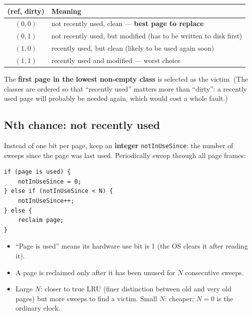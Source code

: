 \documentclass[11pt,a4paper]{article}
\begin{document}
\begin{center}
\renewcommand{\arraystretch}{1.18}
\begin{tabular}{@{}cl@{}}
  \toprule
  \textbf{(ref, dirty)} & \textbf{Meaning} \\
  \midrule
  \((0,0)\) & not recently used, clean --- \textbf{best page to replace} \\
  \((0,1)\) & not recently used, but modified (has to be written to disk first) \\
  \((1,0)\) & recently used, but clean (likely to be used again soon) \\
  \((1,1)\) & recently used and modified --- worst choice \\
  \bottomrule
\end{tabular}
\end{center}

The \textbf{first page in the lowest non-empty class} is selected as the
victim. (The classes are ordered so that ``recently used'' matters more
than ``dirty'': a recently used page will probably be needed again, which
would cost a whole fault.)

\subsection{Nth chance: not recently used}

Instead of one bit per page, keep an \textbf{integer}
\texttt{notInUseSince}: the number of sweeps since the page was last used.
Periodically sweep through all page frames:
\begin{verbatim}
if (page is used) {
    notInUseSince = 0;
} else if (notInUseSince < N) {
    notInUseSince++;
} else {
    reclaim page;
}
\end{verbatim}

\begin{itemize}
  \item ``Page is used'' means its hardware use bit is 1 (the OS clears it
        after reading it).
  \item A page is reclaimed only after it has been unused for \(N\)
        consecutive sweeps.
  \item Large \(N\): closer to true LRU (finer distinction between old and
        very old pages) but more sweeps to find a victim.
        Small \(N\): cheaper; \(N=0\) is the ordinary clock.
\end{itemize}

\end{document}
